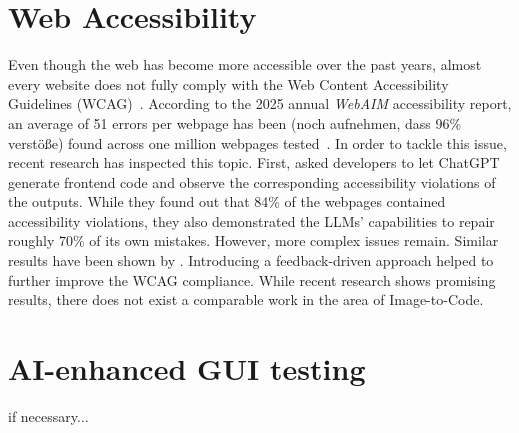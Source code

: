 \section{Web Accessibility}
Even though the web has become more accessible over the past years, almost every website 
does not fully comply with the Web Content Accessibility Guidelines 
(WCAG)~\parencite{wcag21}. According to the 2025 annual \textit{WebAIM}
accessibility report, an average of 51 errors per webpage has been (noch aufnehmen, dass 96\% verstöße) 
found across one million webpages tested~\parencite{webaim2025million}.
In order to tackle this issue, recent research has inspected this topic.
First, \textcite{aljedaani2024chatgpt}
asked developers to let ChatGPT generate frontend code and observe 
the corresponding accessibility violations of the outputs. While they 
found out that 84\% of the webpages contained accessibility violations,
they also demonstrated the LLMs' capabilities to repair roughly 
70\% of its own mistakes. However, more complex issues remain. 
Similar results have been shown by \textcite{suh2025accessiblecode}.
Introducing a feedback-driven approach helped to further improve 
the WCAG compliance.\newline
While recent research shows promising results, there does not exist 
a comparable work in the area of Image-to-Code. 


\section{AI-enhanced GUI testing}
if necessary...
